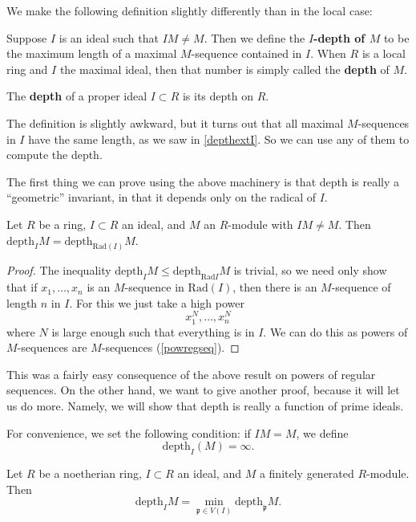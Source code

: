 We make the following definition slightly differently than in the local case:

\begin{definition} 
Suppose $I$ is an ideal such that $IM \neq M$. Then we define the
\textbf{$I$-depth of $M$} to be the maximum length of a maximal $M$-sequence contained
in $I$. When $R$ is a local ring and $I$ the maximal ideal, then that number is
simply called the \textbf{depth} of $M$.

The \textbf{depth} of a proper ideal $I \subset R$ is its depth on $R$.
\end{definition} 


The definition is slightly awkward, but it turns out that all maximal
$M$-sequences in $I$ have the same length, as we saw in \cref{depthextI}. So we can use any of them to compute
the depth. 

The first thing we can prove using the above machinery is that depth is really
a ``geometric'' invariant, in that it depends only on the radical of $I$.

\begin{proposition} 
Let $R$ be a ring, $I \subset R$ an ideal, and $M$ an $R$-module
with $IM \neq M$. Then $\mathrm{depth}_I M = \mathrm{depth}_{\mathrm{Rad}(I)} M$.
\end{proposition} 
\begin{proof} 
The inequality $\mathrm{depth}_I M \leq \mathrm{depth}_{\mathrm{Rad} I} M$ is trivial, so we need only
show that if $x_1, \dots, x_n$ is an $M$-sequence in $\mathrm{Rad}(I)$, then there is
an $M$-sequence of length $n$ in $I$. For this we just take a high power
\[ x_1^N, \dots, x_n^{N}  \]
where $N$ is large enough such that everything is in $I$. We can do this as
powers of $M$-sequences are $M$-sequences (\cref{powregseq}).
\end{proof} 

This was a fairly easy consequence of the above result on powers of regular
sequences. On the other hand, we want to give another proof, because it will
let us do more. Namely, we will show that depth is really a function of prime
ideals.

For convenience, we set the following condition: if $IM = M$, we define
\[ \mathrm{depth}_I (M) = \infty.  \]

\begin{proposition} \label{depthlocal}
Let $R$ be a noetherian ring, $I \subset R$ an ideal, and $M$ a finitely generated $R$-module. 
Then
\[ \mathrm{depth}_I M = \min_{\mathfrak{p} \in V(I)} \mathrm{depth}_{\mathfrak{p}} M .  \]
\end{proposition} 

